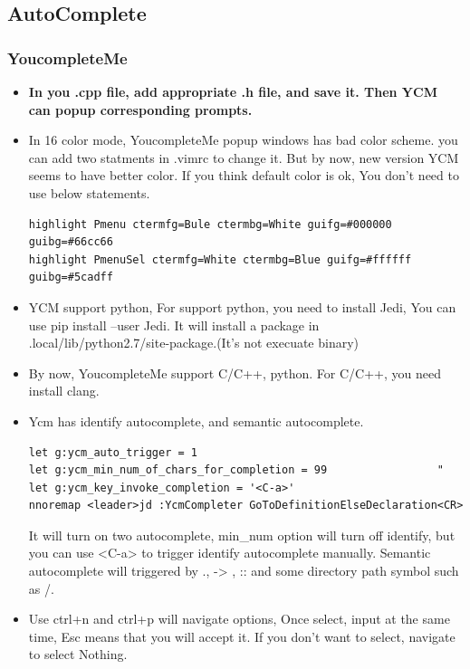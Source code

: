 \documentclass[a4paper,12pt,twoside]{book}
\begin{document}
\subsection{AutoComplete}
\subsubsection{YoucompleteMe}

\begin{itemize}

		\item \textbf{In you .cpp file, add appropriate .h file, and save it. Then YCM can  popup corresponding prompts.} 

		\item In 16 color mode, YoucompleteMe popup windows has bad color scheme. you can add two statments in .vimrc to change it. But by now, new version YCM seems to have better color. If you think default color is ok, You don't need to use below statements. 
\begin{verbatim}
highlight Pmenu ctermfg=Bule ctermbg=White guifg=#000000 guibg=#66cc66
highlight PmenuSel ctermfg=White ctermbg=Blue guifg=#ffffff guibg=#5cadff
\end{verbatim}

\item YCM support python, For support python, you need to install Jedi, You can use pip install --user Jedi.	It will install a package in .local/lib/python2.7/site-package.(It's not execuate binary)	

\item By now, YoucompleteMe support C/C++, python. For C/C++, you need install clang.  

\item Ycm has identify autocomplete, and semantic autocomplete. 
\begin{verbatim}
let g:ycm_auto_trigger = 1
let g:ycm_min_num_of_chars_for_completion = 99                 "
let g:ycm_key_invoke_completion = '<C-a>'
nnoremap <leader>jd :YcmCompleter GoToDefinitionElseDeclaration<CR>
\end{verbatim}
It will turn on two autocomplete, min\_num option will turn off identify, but you can use <C-a> to trigger identify autocomplete manually. Semantic autocomplete will triggered by ., -> , :: and some directory path symbol such as /. 

\item Use ctrl+n and ctrl+p will navigate options, Once select, input at the same time, Esc means that you will accept it. If you don't want to select, navigate to select Nothing. 


\end{itemize}
\end{document}
